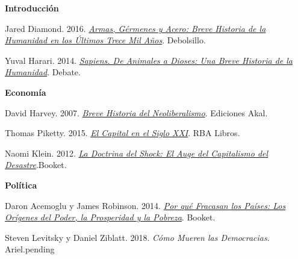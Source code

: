 \documentclass[letterpaper]{article}
\renewenvironment{itemize}{
  \begin{list}{}{
    \setlength{\leftmargin}{1.5em}
  }
}{
  \end{list}
}
\begin{document}
\begin{enumerate}

\item {\bf Introducci\'on}

      \begin{itemize}
        \item[$\bullet$] Jared Diamond. 2016. \href{https://github.com/hbahamonde/Intro_Ciencias_Sociales/raw/master/Readings/Armas_germenes_acero_Diamond.pdf}{\emph{Armas, G\'ermenes y Acero: Breve Historia de la Humanidad en los \'Ultimos Trece Mil A\~nos}}. Debolsillo.
        \item[$\bullet$] Yuval Harari. 2014. \href{https://github.com/hbahamonde/Intro_Ciencias_Sociales/raw/master/Readings/De_Animales_Dioses_Harari.pdf}{\emph{Sapiens. De Animales a Dioses: Una Breve Historia de la Humanidad}}. Debate.
      \end{itemize}





\item {\bf Econom\'ia}

      \begin{itemize}
        \item[$\bullet$] David Harvey. 2007. \href{https://github.com/hbahamonde/Intro_Ciencias_Sociales/raw/master/Readings/Breve_histora_Neoliberalismo_Harvey.pdf}{\emph{Breve Historia del Neoliberalismo}}. Ediciones Akal.
        \item[$\bullet$] Thomas Piketty. 2015. \href{https://github.com/hbahamonde/Intro_Ciencias_Sociales/raw/master/Readings/Piketty_El_capital.pdf}{\emph{El Capital en el Siglo XXI}}. RBA Libros.
        \item[$\bullet$] Naomi Klein. 2012. \href{https://github.com/hbahamonde/Intro_Ciencias_Sociales/raw/master/Readings/La_doctrina_del_shock_Klein.pdf}{\emph{La Doctrina del Shock: El Auge del Capitalismo del Desastre}}.Booket.
      \end{itemize}


\item {\bf Pol\'itica}

      \begin{itemize}
        \item[$\bullet$] Daron Acemoglu y James Robinson. 2014. \href{https://github.com/hbahamonde/Intro_Ciencias_Sociales/raw/master/Readings/Why_Nations_Fail.pdf}{\emph{Por qu\'e Fracasan los Pa\'ises: Los Or\'igenes del Poder, la Prosperidad y la Pobreza}}. Booket.
        \item[$\bullet$] Steven Levitsky y Daniel Ziblatt. 2018. \emph{C\'omo Mueren las Democracias}. Ariel.{\color{red}pending}
      \end{itemize}


\end{enumerate}
\end{document}
